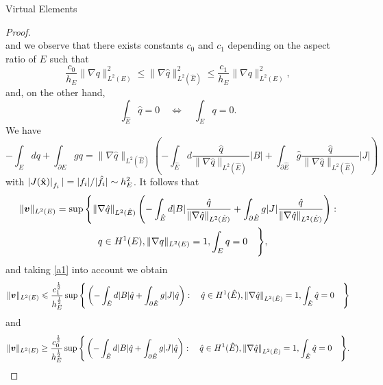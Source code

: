 \begin{chapter}{Virtual Elements}
\begin{proof}
\[\] 
and we observe that there exists constants $c_0$ and $c_1$ depending on the
aspect ratio of $E$ such that
\begin{equation}\label{a1}
\frac{c_0}{h_E}\|\nabla q\|_{L^2(E)}^2\leqslant \|\nabla\hat q\|_{L^2(\hat E)}^2\le
\frac{c_1}{h_E}\|\nabla q\|_{L^2(E)}^2,
\end{equation}
and, on the other hand,
\[
\int_{\hat E}\hat q =0\quad \Longleftrightarrow \quad\int_Eq=0.
\]
We have
\[
-\int_Edq + \int_{\partial E}gq = \|\nabla \hat q\|_{L^2(\hat E)}
\left(-\int_{\hat E}d\frac{\hat q}{\|\nabla\hat q\|_{L^2(\hat E)}}|B| + 
\int_{\partial \hat E}\hat g\frac{\hat q}{\|\nabla\hat q\|_{L^2(\hat E)}} |J|\right)
\]
with $\left|J(\hat{\bf x})\right|_{f_i}|= |f_i|/|\hat f_i|\sim h_E^2$. It follows that
\begin{multline*}
\|\boldsymbol{v}\|_{L^2(E)}=\sup\Bigg\{\|\nabla \hat q\|_{L^2(\hat E)}
\left(-\int_{\hat E}d|B|\frac{\hat q}{\|\nabla\hat q\|_{L^2(\hat E)}} + 
\int_{\partial \hat E}g|J|\frac{\hat q}{\|\nabla\hat q\|_{L^2(\hat E)}} 
\right):\\ \quad q\in H^1(E),\|\nabla q\|_{L^2(E)}=1,\int_Eq=0\quad\Bigg\},
\end{multline*}
and taking \eqref{a1} into account we obtain
\begin{equation}\label{mult1}
\|\boldsymbol{v}\|_{L^2(E)}\leqslant  \frac{c_1^\frac12}{h_E^\frac12}\sup\Bigg\{
\left(-\int_{\hat E}d|B|\hat q + \int_{\partial \hat E}g|J|\hat q \right): 
\quad \hat q\in H^1(\hat E),\|\nabla \hat q\|_{L^2(\hat E)}=1,\int_{\hat E}\hat q=0\quad\Bigg\}
\end{equation}
and 
\begin{equation}\label{mult2}
\|\boldsymbol{v}\|_{L^2(E)}\ge  \frac{c_0^\frac12}{h_E^\frac12}\sup\Bigg\{
\left(-\int_{\hat E}d|B|\hat q + \int_{\partial \hat E}g|J|\hat q \right):
\quad \hat q\in H^1(\hat E),\|\nabla \hat q\|_{L^2(\hat E)}=1,\int_{\hat E}\hat q=0\quad\Bigg\}.
\end{equation}

\end{proof}
\end{chapter}
